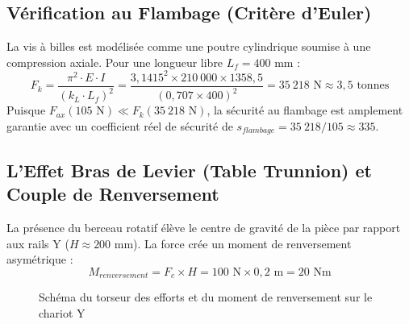 \subsection{Vérification au Flambage (Critère d'Euler)}
La vis à billes est modélisée comme une poutre cylindrique soumise à une compression axiale. Pour une longueur libre $L_f = 400 \text{ mm}$ :
\begin{equation}
    F_k = \frac{\pi^2 \cdot E \cdot I}{(k_L \cdot L_f)^2} = \frac{3{,}1415^2 \times 210~000 \times 1358{,}5}{(0{,}707 \times 400)^2} = \boxed{35~218 \text{ N}} \approx 3{,}5 \text{ tonnes}
\end{equation}
Puisque $F_{ax} (105\text{ N}) \ll F_{k} (35~218\text{ N})$, la sécurité au flambage est amplement garantie avec un coefficient réel de sécurité de $s_{flambage} = 35~218 / 105 \approx 335$.

\subsection{L'Effet Bras de Levier (Table Trunnion) et Couple de Renversement}
La présence du berceau rotatif élève le centre de gravité de la pièce par rapport aux rails Y ($H \approx 200 \text{ mm}$). La force crée un moment de renversement asymétrique :
\begin{equation}
    M_{renversement} = F_c \times H = 100 \text{ N} \times 0{,}2 \text{ m} = \boxed{20 \text{ Nm}}
\end{equation}

\begin{figure}[htbp]
    \centering
    \caption{Schéma du torseur des efforts et du moment de renversement sur le chariot Y}
    \label{fig:torseur_trunnion}
\end{figure}

